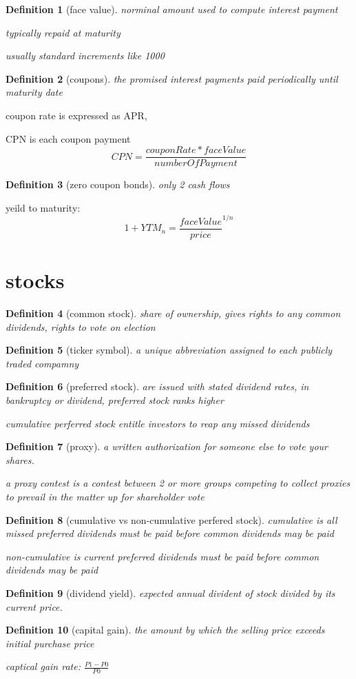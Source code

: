 \documentclass[10pt]{article}
\theoremstyle{break}
\newtheorem{defn}{Definition}[subsection]
\begin{document}
\begin{defn}[face value]
    norminal amount used to compute interest payment

    typically repaid at maturity 

    usually standard increments like 1000
\end{defn}

\begin{defn}[coupons]
    the promised interest payments paid periodically until maturity date 
\end{defn}

coupon rate is expressed as APR, 

CPN is each coupon payment
$$CPN=\frac{couponRate * faceValue}{numberOfPayment}$$

\begin{defn}[zero coupon bonds]
   only 2 cash flows 
\end{defn}

yeild to maturity: 
$$1+YTM_n = \frac{faceValue}{price}^{1/n}$$

\section{stocks}
\begin{defn}[common stock]
    share of ownership, gives rights to any common dividends, rights to vote on election
\end{defn}
\begin{defn}[ticker symbol]
    a unique abbreviation assigned to each publicly traded compamny
\end{defn}
\begin{defn}[preferred stock]
    are issued with stated dividend rates, in bankruptcy or dividend, preferred stock ranks higher

    cumulative perferred stock entitle investors to reap any missed dividends
\end{defn}

\begin{defn}[proxy]
    a written authorization for someone else to vote your shares.

    a proxy contest is a contest between 2 or more groups competing to collect proxies to prevail in the matter up for shareholder vote
\end{defn}
\begin{defn}[cumulative vs non-cumulative perfered stock]
    cumulative is all missed preferred dividends must be paid before common dividends may be paid
    
    non-cumulative is current preferred dividends must be paid before common dividends may be paid
\end{defn}
\begin{defn}[dividend yield]
    expected annual divident of stock divided by its current price.
\end{defn}
\begin{defn}[capital gain]
    the amount by which the selling price exceeds initial purchase price

    captical gain rate: $\frac{P1-P0}{P0}$
\end{defn}
\end{document}
